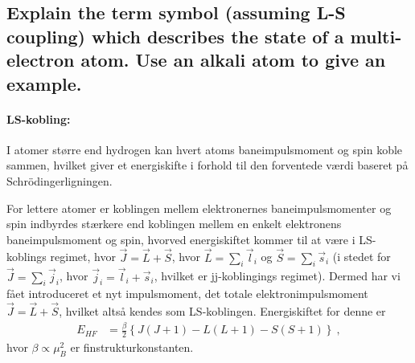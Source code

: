 \subsection{Explain the term symbol (assuming L-S coupling) which describes the state of a multi-electron atom. Use an alkali atom to give an example.}


\paragraph{LS-kobling:} I atomer større end hydrogen kan hvert atoms baneimpulsmoment og spin koble sammen, hvilket giver et energiskifte i forhold til den forventede værdi baseret på Schrödingerligningen.

For lettere atomer er koblingen mellem elektronernes baneimpulsmomenter og spin indbyrdes stærkere end koblingen mellem en enkelt elektronens baneimpulsmoment og spin, hvorved energiskiftet kommer til at være i LS-koblings regimet, hvor $\Vec{J} = \Vec{L} + \Vec{S}$, hvor $\Vec{L} = \sum_i \Vec{l}_i$ og $\Vec{S} = \sum_i \Vec{s}_i$ (i stedet for $\Vec{J} = \sum_i \Vec{j}_i$, hvor $\Vec{j}_i = \Vec{l}_i + \Vec{s}_i$, hvilket er jj-koblingings regimet). Dermed har vi fået introduceret et nyt impulsmoment, det totale elektronimpulsmoment $\Vec{J} = \Vec{L} + \Vec{S}$, hvilket altså kendes som LS-koblingen. Energiskiftet for denne er
\begin{align}
    E_{HF} &= \frac{\beta}{2} \left\{J(J+1) - L(L+1) - S(S+1)\right\} \: ,
\end{align}
hvor $\beta \propto \mu_B^2$ er finstrukturkonstanten.


